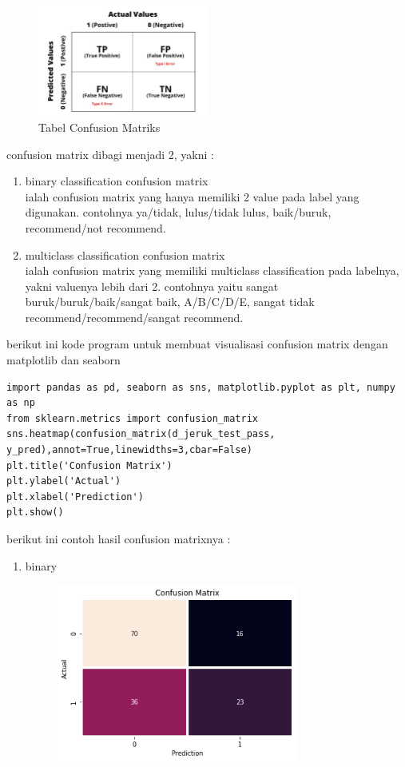 \begin{enumerate}
\begin{figure}[H]
    \centering
    \includegraphics[width=0.50\textwidth]{figures/confusion_matriks.jpeg}
    \caption{Tabel Confusion Matriks}
    \label{fig:my_label}
\end{figure}
\par confusion matrix dibagi menjadi 2, yakni :
\begin{enumerate}
    \item binary classification confusion matrix \\
    ialah confusion matrix yang hanya memiliki 2 value pada label yang digunakan. contohnya ya/tidak, lulus/tidak lulus, baik/buruk, recommend/not recommend.
    \item multiclass classification confusion matrix\\
    ialah confusion matrix yang memiliki multiclass classification pada labelnya, yakni valuenya lebih dari 2. contohnya yaitu sangat buruk/buruk/baik/sangat baik, A/B/C/D/E, sangat tidak recommend/recommend/sangat recommend.
\end{enumerate}
berikut ini kode program untuk membuat visualisasi confusion matrix dengan matplotlib dan seaborn
\begin{lstlisting}
import pandas as pd, seaborn as sns, matplotlib.pyplot as plt, numpy as np
from sklearn.metrics import confusion_matrix
sns.heatmap(confusion_matrix(d_jeruk_test_pass, y_pred),annot=True,linewidths=3,cbar=False)
plt.title('Confusion Matrix')
plt.ylabel('Actual')
plt.xlabel('Prediction')
plt.show()
\end{lstlisting}
berikut ini contoh hasil confusion matrixnya :
\begin{enumerate}
    \item binary
    \begin{figure}[H]
    \centering
    \includegraphics[width=0.75\textwidth]{figures/confusion_matrix.png}

\end{figure}
\end{enumerate}
\end{enumerate}
